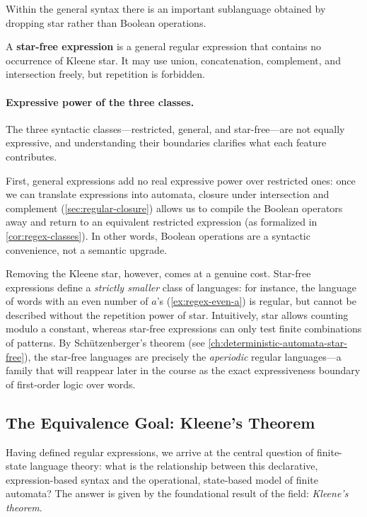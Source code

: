 Within the general syntax there is an important sublanguage obtained by
dropping star rather than Boolean operations.

\begin{definition}
\label{def:star-free}
A \textbf{star-free expression} is a general regular expression that
contains no occurrence of Kleene star.  It may use union, concatenation,
complement, and intersection freely, but repetition is forbidden.
\end{definition}

\paragraph{Expressive power of the three classes.}
The three syntactic classes---restricted, general, and star-free---are not equally expressive, and understanding their boundaries clarifies what each feature contributes.

First, general expressions add no real expressive power over restricted ones: once we can translate expressions into automata, closure under intersection and complement (\cref{sec:regular-closure}) allows us to compile the Boolean operators away and return to an equivalent restricted expression (as formalized in \cref{cor:regex-classes}). In other words, Boolean operations are a syntactic convenience, not a semantic upgrade.

Removing the Kleene star, however, comes at a genuine cost. Star-free expressions define a \emph{strictly smaller} class of languages: for instance, the language of words with an even number of $a$'s (\cref{ex:regex-even-a}) is regular, but cannot be described without the repetition power of star. Intuitively, star allows counting modulo a constant, whereas star-free expressions can only test finite combinations of patterns. By Sch\"utzenberger's theorem (see \cref{ch:deterministic-automata-star-free}), the star-free languages are precisely the \emph{aperiodic} regular languages---a family that will reappear later in the course as the exact expressiveness boundary of first-order logic over words.

\subsection{The Equivalence Goal: Kleene's Theorem}
\label{subsec:kleene-theorem}

Having defined regular expressions, we arrive at the central question of finite-state language theory: what is the relationship between this declarative, expression-based syntax and the operational, state-based model of finite automata? The answer is given by the foundational result of the field: \emph{Kleene's theorem}.


